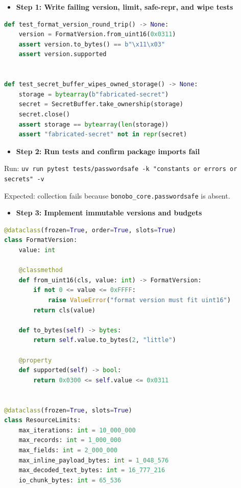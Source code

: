 \documentclass[
  letterpaper,
]{article}
\newcommand{\passthrough}[1]{#1}
\providecommand{\tightlist}{%
  \setlength{\itemsep}{0pt}\setlength{\parskip}{0pt}}
\begin{document}
\begin{itemize}
\tightlist
\item[$\square$]
  \textbf{Step 1: Write failing version, limit, safe-repr, and wipe tests}
\end{itemize}

\begin{lstlisting}[language=Python]
def test_format_version_round_trip() -> None:
    version = FormatVersion.from_uint16(0x0311)
    assert version.to_bytes() == b"\x11\x03"
    assert version.supported


def test_secret_buffer_wipes_owned_storage() -> None:
    storage = bytearray(b"fabricated-secret")
    secret = SecretBuffer.take_ownership(storage)
    secret.close()
    assert storage == bytearray(len(storage))
    assert "fabricated-secret" not in repr(secret)
\end{lstlisting}

\begin{itemize}
\tightlist
\item[$\square$]
  \textbf{Step 2: Run tests and confirm package imports fail}
\end{itemize}

Run: \passthrough{\lstinline!uv run pytest tests/passwordsafe -k "constants or errors or secrets" -v!}

Expected: collection fails because \nolinkurl{bonobo_core.passwordsafe} is absent.

\begin{itemize}
\tightlist
\item[$\square$]
  \textbf{Step 3: Implement immutable versions and budgets}
\end{itemize}

\begin{lstlisting}[language=Python]
@dataclass(frozen=True, order=True, slots=True)
class FormatVersion:
    value: int

    @classmethod
    def from_uint16(cls, value: int) -> FormatVersion:
        if not 0 <= value <= 0xFFFF:
            raise ValueError("format version must fit uint16")
        return cls(value)

    def to_bytes(self) -> bytes:
        return self.value.to_bytes(2, "little")

    @property
    def supported(self) -> bool:
        return 0x0300 <= self.value <= 0x0311


@dataclass(frozen=True, slots=True)
class ResourceLimits:
    max_iterations: int = 10_000_000
    max_records: int = 1_000_000
    max_fields: int = 2_000_000
    max_inline_payload_bytes: int = 1_048_576
    max_decoded_text_bytes: int = 16_777_216
    io_chunk_bytes: int = 65_536
\end{lstlisting}
\end{document}
